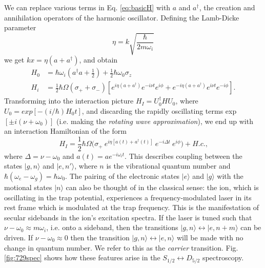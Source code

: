 We can replace various terms in Eq. \ref{eq:basicH} with $a$ and $a^{\dagger}$, the creation and annihilation operators of the harmonic oscillator. Defining the Lamb-Dicke parameter
\begin{equation}
\eta = k \sqrt{ \frac{\hbar}{2 m \omega_i} }
\end{equation}
we get $kx = \eta (a + a^{\dagger})$, and obtain
\begin{equation}
\begin{split}
H_0 &= \hbar \omega_i (a^{\dagger} a + \frac{1}{2} ) + \frac{1}{2} \hbar \omega_0 \sigma_z \\
H_i &= \frac{1}{2} \hbar \Omega (\sigma_+ + \sigma_-) [ e^{i \eta (a + a^{\dagger}) } e^{-i \nu t} e^{i \phi}  +  e^{-i \eta (a + a^{\dagger}) } e^{i \nu t} e^{-i \phi} ]  \text{.}
\end{split}
\end{equation}
Transforming into the interaction picture $H_I = U_0^{\dagger} H U_0$, where $U_0 = exp[-(i / \hbar) H_0 t]$, and discarding the rapidly oscillating terms exp$[\pm i (\nu + \omega_0)]$ (i.e. making the \textit{rotating wave approximation}), we end up with an interaction Hamiltonian of the form 
\begin{equation}
H_I = \frac{1}{2} \hbar \Omega \big( \sigma_+ \ e^{ i \eta [a(t) + a^{\dagger}(t) ] } \ e^{- i \Delta t} \ e^{i \phi}  \big) + H.c. \text{,}
\end{equation}
where $\Delta = \nu - \omega_0$ and $a(t) = a e^{-i \omega_i t}$. This describes coupling between the states $|g, n\rangle$ and $|e, n'\rangle$, where $n$ is the vibrational quantum number and $\hbar (\omega_e - \omega_g) = \hbar \omega_0$. The pairing of the electronic states $|e\rangle$ and $|g\rangle$ with the motional states $|n\rangle$ can also be thought of in the classical sense: the ion, which is oscillating in the trap potential, experiences a frequency-modulated laser in its rest frame which is modulated at the trap frequency. This is the manifestation of secular sidebands in the ion's excitation spectra. If the laser is tuned such that $\nu - \omega_0 \approx m \omega_i$, i.e. onto a sideband, then the transitions $|g,n\rangle \leftrightarrow |e, n+m\rangle$ can be driven. If $\nu - \omega_0 \approx 0$ then the transition $|g,n\rangle \leftrightarrow |e, n\rangle$ will be made with no change in quantum number. We refer to this as the \textit{carrier} transition. Fig. \ref{fig:729spec} shows how these features arise in the $S_{1/2} \leftrightarrow D_{5/2}$ spectroscopy. 

